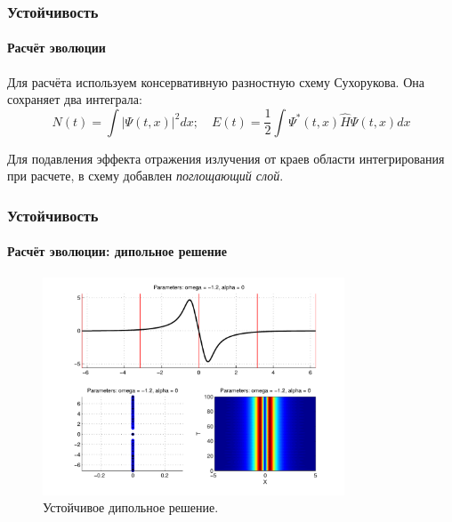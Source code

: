 \documentclass [10pt] {beamer}
\begin{document}
\begin{frame}
	\frametitle{Устойчивость}
	\framesubtitle{Расчёт эволюции}
	
	Для расчёта используем консервативную разностную схему Сухорукова\footnotemark[6].
	Она сохраняет два интеграла:
	\begin{equation}
		N(t) = \int |\Psi(t, x)|^2 dx; \quad
		E(t) = \dfrac{1}{2} \int \Psi^*(t, x) \widehat{H} \Psi(t, x) dx
	\end{equation}

	Для подавления эффекта отражения излучения от краев области интегрирования при расчете, в схему добавлен {\it {\color{ceruleanblue} поглощающий слой}}. 
	
\end{frame}

\begin{frame}
	\frametitle{Устойчивость}
	\framesubtitle{Расчёт эволюции: дипольное решение}
	
	\begin{figure}
		\includegraphics[width=0.8\textwidth]{pic/dipole_solution_stable.pdf}
		\caption{Устойчивое дипольное решение.}
		\label{pic:dipole_solution_stable}
	\end{figure}
\end{frame}
\end{document}
